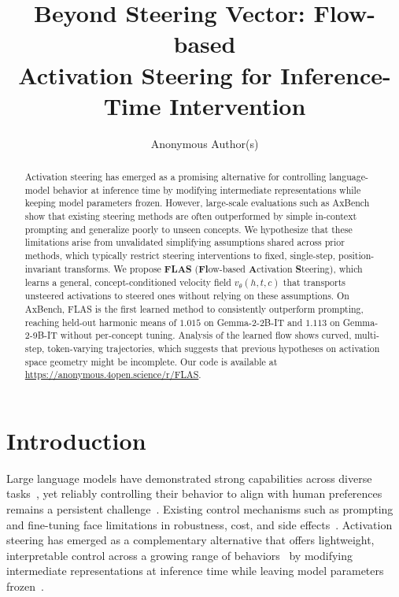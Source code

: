 \documentclass{article}
\title{Beyond Steering Vector: Flow-based \\ Activation Steering for Inference-Time Intervention}
\author{%
  Anonymous Author(s)
}
\newcommand{\vt}{v_\theta}
\begin{document}
\maketitle

\begin{abstract}
Activation steering has emerged as a promising alternative for controlling language-model behavior at inference time by modifying intermediate representations while keeping model parameters frozen. However, large-scale evaluations such as AxBench show that existing steering methods are often outperformed by simple in-context prompting and generalize poorly to unseen concepts. We hypothesize that these limitations arise from unvalidated simplifying assumptions shared across prior methods, which typically restrict steering interventions to fixed, single-step, position-invariant transforms. We propose \textbf{FLAS} (\textbf{Fl}ow-based \textbf{A}ctivation \textbf{S}teering), which learns a general, concept-conditioned velocity field $\vt(h,t,c)$ that transports unsteered activations to steered ones without relying on these assumptions. On AxBench, FLAS is the first learned method to consistently outperform prompting, reaching held-out harmonic means of $1.015$ on Gemma-2-2B-IT and $1.113$ on Gemma-2-9B-IT without per-concept tuning. Analysis of the learned flow shows curved, multi-step, token-varying trajectories, which suggests that previous hypotheses on activation space geometry might be incomplete. Our code is available at \url{https://anonymous.4open.science/r/FLAS}.
\end{abstract}

\section{Introduction}
\label{sec:intro}
Large language models have demonstrated strong capabilities across diverse tasks~\citep{brown2020languagemodelsfewshotlearners, Grattafiori2024, Team2024}, yet reliably controlling their behavior to align with human preferences remains a persistent challenge~\citep{anwar2024foundational}. Existing control mechanisms such as prompting and fine-tuning face limitations in robustness, cost, and side effects~\citep{anwar2024foundational, Hu2021, kotha2024understandingcatastrophicforgettinglanguage, luo2025empiricalstudycatastrophicforgetting}. Activation steering has emerged as a complementary alternative that offers lightweight, interpretable control across a growing range of behaviors~\citep{park2025steerllmlatentshallucination, boxo2025caughtactmechanisticapproach, Lee2025a, frising2026linearpersonalityprobingsteering, yang2025exploringpersonalitytraitsllms} by modifying intermediate representations at inference time while leaving model parameters frozen~\citep{giulianelli2021hoodusingdiagnosticclassifiers, Turner2024, Zou2025}.
 
\end{document}
